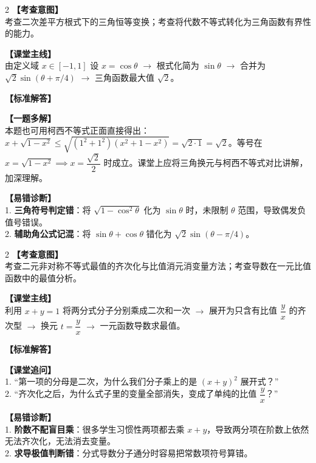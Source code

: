 \documentclass[11pt,a4paper]{ctexart}
\begin{document}
\begin{paracol}{2}
  \textbf{【考查意图】}\\
  考查二次差平方根式下的三角恒等变换；考查将代数不等式转化为三角函数有界性的能力。
  
  \textbf{【课堂主线】}\\
  由定义域 \(x \in [-1,1]\) 设 \(x = \cos\theta\) \(\to\) 根式化简为 \(\sin\theta\) \(\to\) 合并为 \(\sqrt{2}\sin(\theta+\pi/4)\) \(\to\) 三角函数最大值 \(\sqrt{2}\)。
  
  \textbf{【标准解答】}\\
  \qTwoSolution
  
  \textbf{【一题多解】}\\
  本题也可用柯西不等式正面直接得出：\\
  \(x + \sqrt{1-x^2} \leqslant \sqrt{(1^2+1^2)(x^2+1-x^2)} = \sqrt{2 \cdot 1} = \sqrt{2}\)。等号在 \(x = \sqrt{1-x^2} \implies x = \dfrac{\sqrt{2}}{2}\) 时成立。课堂上应将三角换元与柯西不等式对比讲解，加深理解。

  \switchcolumn
  \textbf{【易错诊断】}\\
  1. \textbf{三角符号判定错}：将 \(\sqrt{1-\cos^2\theta}\) 化为 \(\sin\theta\) 时，未限制 \(\theta\) 范围，导致偶发负值号错误。\\
  2. \textbf{辅助角公式记混}：将 \(\sin\theta+\cos\theta\) 错化为 \(\sqrt{2}\sin(\theta-\pi/4)\)。
\end{paracol}

\vspace{0.8em}
\par{}
\vspace{0.8em}

\newpage

\qThreeStem
\qThreeOptions

\begin{paracol}{2}
  \textbf{【考查意图】}\\
  考查二元非对称不等式最值的齐次化与比值消元消变量方法；考查导数在一元比值函数中的最值分析。
  
  \textbf{【课堂主线】}\\
  利用 \(x+y=1\) 将两分式分子分别乘成二次和一次 \(\to\) 展开为只含有比值 \(\dfrac{y}{x}\) 的齐次型 \(\to\) 换元 \(t = \dfrac{y}{x}\) \(\to\) 一元函数导数求最值。
  
  \textbf{【标准解答】}\\
  \qThreeSolution
  
  \textbf{【课堂追问】}\\
  1. “第一项的分母是二次，为什么我们分子乘上的是 \((x+y)^2\) 展开式？”\\
  2. “齐次化之后，为什么式子里的变量全部消失，变成了单纯的比值 \(\dfrac{y}{x}\)？”
  
  \switchcolumn
  \textbf{【易错诊断】}\\
  1. \textbf{阶数不配盲目乘}：很多学生习惯性两项都去乘 \(x+y\)，导致两分项在阶数上依然无法齐次化，无法消去变量。\\
  2. \textbf{求导极值判断错}：分式导数分子通分时容易把常数项符号算错。
\end{paracol}
\end{document}
